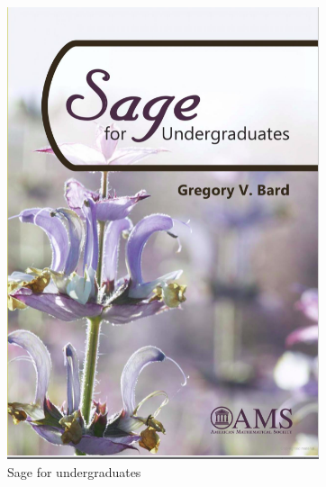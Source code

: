 \documentclass[12pt]{beamer}
\begin{document}
\begin{frame}
\begin{itemize}
\begin{figure}[h]
\begin{minipage}{.4\textwidth}
      \end{minipage}
      \begin{minipage}{.4\textwidth}
              \includegraphics[scale=0.2]{img/sfu.png}
      \caption{Sage for undergraduates}
      \end{minipage}
    \end{figure}
  \end{itemize}
\end{frame}
\end{document}
